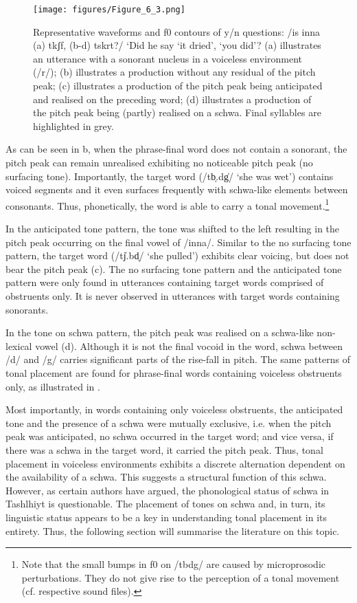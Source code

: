   \begin{figure}
   \texttt{[image: figures/Figure\_6\_3.png]}
  \caption{Representative waveforms and f0 contours of y/n questions: /is inna (a) tkʃf, (b-d) tskrt?/ ‘Did he say ‘it dried’, ‘you did’? (a) illustrates an utterance with a sonorant nucleus in a voiceless environment (/r/); (b) illustrates a production without any residual of the pitch peak; (c) illustrates a production of the pitch peak being anticipated and realised on the preceding word; (d) illustrates a production of the pitch peak being (partly) realised on a schwa. Final syllables are highlighted in grey.}
   \label{fig:6.3}
   \end{figure}

As can be seen in b, when the phrase-final word does not contain a sonorant, the pitch peak can remain unrealised exhibiting no noticeable pitch peak (no surfacing tone). Importantly, the target word (/tb̩.dg̍/ ‘she was wet’) contains voiced segments and it even surfaces frequently with schwa-like elements between consonants. Thus, phonetically, the word is able to carry a tonal movement.\footnote{Note that the small bumps in f0 on /tbdg/ are caused by microprosodic perturbations. They do not give rise to the perception of a tonal movement (cf. respective sound files).}

In the anticipated tone pattern, the tone was shifted to the left resulting in the pitch peak occurring on the final vowel of /inna/. Similar to the no surfacing tone pattern, the target word (/tj̍.bd̩/ ‘she pulled’) exhibits clear voicing, but does not bear the pitch peak (c). The no surfacing tone pattern and the anticipated tone pattern were only found in utterances containing target words comprised of obstruents only. It is never observed in utterances with target words containing sonorants. 

In the tone on schwa pattern, the pitch peak was realised on a schwa-like non-lexical vowel (d). Although it is not the final vocoid in the word, schwa between /d/ and /g/ carries significant parts of the rise-fall in pitch. The same patterns of tonal placement are found for phrase-final words containing voiceless obstruents only, as illustrated in . 

Most importantly, in words containing only voiceless obstruents, the anticipated tone and the presence of a schwa were mutually exclusive, i.e. when the pitch peak was anticipated, no schwa occurred in the target word; and vice versa, if there was a schwa in the target word, it carried the pitch peak. Thus, tonal placement in voiceless environments exhibits a discrete alternation dependent on the availability of a schwa. This suggests a structural function of this schwa. However, as certain authors have argued, the phonological status of schwa in Tashlhiyt is questionable. The placement of tones on schwa and, in turn, its linguistic status appears to be a key in understanding tonal placement in its entirety. Thus, the following section will summarise the literature on this topic.

